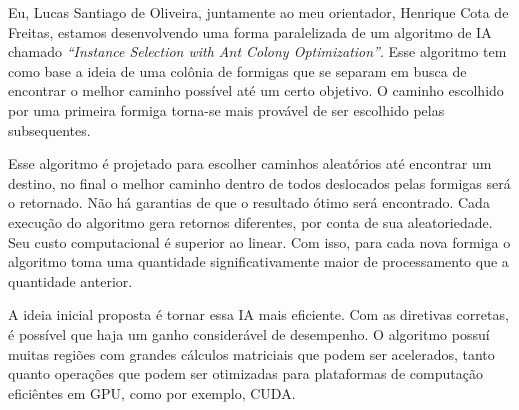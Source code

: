 Eu, Lucas Santiago de Oliveira, juntamente ao meu orientador, Henrique Cota de Freitas, estamos
desenvolvendo uma forma paralelizada de um algoritmo de IA chamado \emph{``Instance Selection with Ant Colony Optimization''}. Esse algoritmo tem como
base a ideia de uma colônia de formigas que se separam em busca de encontrar o melhor caminho
possível até um certo objetivo. O caminho escolhido por uma primeira formiga torna-se mais provável de ser escolhido
pelas subsequentes.

Esse algoritmo é projetado para escolher caminhos aleatórios até encontrar um destino, no final o melhor caminho dentro de todos deslocados pelas formigas
será o retornado. Não há garantias de que o resultado ótimo será encontrado. Cada execução do algoritmo gera retornos diferentes, por conta
de sua aleatoriedade. Seu custo computacional é superior ao linear. Com isso, para cada nova formiga o algoritmo toma uma quantidade
significativamente maior de processamento que a quantidade anterior.

A ideia inicial proposta é tornar essa IA mais eficiente. Com as diretivas corretas, é possível que haja um ganho considerável de 
desempenho. O algoritmo possuí muitas regiões com grandes cálculos matriciais que podem ser acelerados, tanto quanto operações que
podem ser otimizadas para plataformas de computação eficiêntes em GPU, como por exemplo, CUDA.
